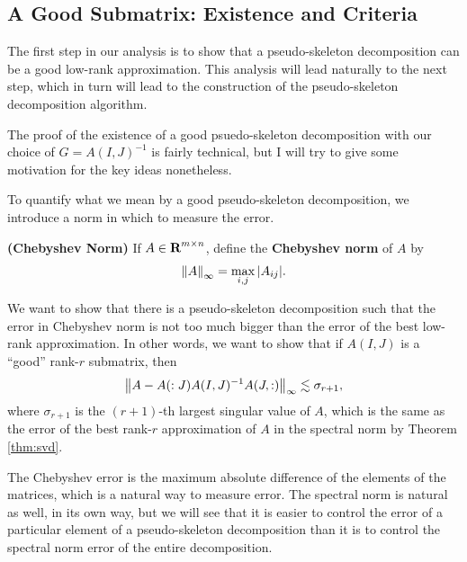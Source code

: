 \documentclass{article}
\begin{document}
	\subsection{A Good Submatrix: Existence and Criteria}
	
	The first step in our analysis is to show that a pseudo-skeleton decomposition can be a good low-rank approximation. This analysis will lead naturally to the next step, which in turn will lead to the construction of the pseudo-skeleton decomposition algorithm.
	
	The proof of the existence of a good psuedo-skeleton decomposition with our choice of $G = A(I,J)^{-1}$ is fairly technical, but I will try to give some motivation for the key ideas nonetheless. 
	
	
	To quantify what we mean by a good pseudo-skeleton decomposition, we introduce a norm in which to measure the error.
	
	\begin{dfn} \textnormal{\bf(Chebyshev Norm)}
		\label{def:chebyshev_norm}
		If $A \in \textnormal{\bf R}^{m\times n}$, define the \textbf{Chebyshev norm} of $A$ by
		\begin{equation}
			\label{eq:chebyshev_norm}
			\left\lVert A \right\rVert_\infty = \max_{i,j} |A_{ij}|.
		\end{equation}
	\end{dfn}
	
	We want to show that there is a pseudo-skeleton decomposition such that the error in Chebyshev norm is not too much bigger than the error of the best low-rank approximation. In other words, we want to show that if $A(I,J)$ is a ``good'' rank-$r$ submatrix, then
	\begin{equation}
		\label{eq:theory_goal}
		\left\lVert A - A(:J)A(I,J)^{-1}A(J,:) \right\rVert_\infty \lesssim \sigma_{r+1},
	\end{equation}
	where $\sigma_{r+1}$ is the $(r+1)$-th largest singular value of $A$, which is the same as the error of the best rank-$r$ approximation of $A$ in the spectral norm by Theorem \ref{thm:svd}.
	
	The Chebyshev error is the maximum absolute difference of the elements of the matrices, which is a natural way to measure error. The spectral norm is natural as well, in its own way, but we will see that it is easier to control the error of a particular element of a pseudo-skeleton decomposition than it is to control the spectral norm error of the entire decomposition.
	
\end{document}
